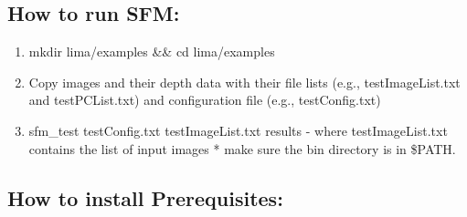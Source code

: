 \documentclass[12pt]{article}
\begin{document}
\subsection{How to run SFM:}
\begin{enumerate}
	\item{mkdir lima/examples \&\& cd lima/examples}
	\item{Copy images and their depth data with their file lists (e.g., testImageList.txt and testPCList.txt) and configuration file (e.g., testConfig.txt)}
	\item{sfm\_test testConfig.txt testImageList.txt results} - where testImageList.txt contains the list of input images
	* make sure the bin directory is in \$PATH.
\end{enumerate}

\subsection{How to install Prerequisites:}\label{sec:How to install Prerequisites}
\end{document}
